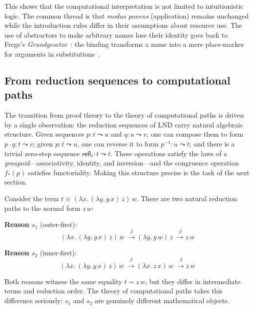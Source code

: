 \documentclass[manuscript]{BSLstyle}
\newcommand{\refl}{\mathsf{refl}}
\begin{document}
\noindent
This shows that the computational interpretation is not limited to
intuitionistic logic.  The common thread is that \emph{modus ponens}
(application) remains unchanged while the introduction rules differ in
their assumptions about resource use.  The use of abstractors to make
arbitrary names lose their identity goes back to Frege's
\emph{Grundgesetze}~\cite{Frege93:GrundI}: the binding transforms a
name into a mere place-marker for arguments in
substitutions~\cite{deQueiroz92:wittgenstein15}.

\subsection{From reduction sequences to computational paths}

The transition from proof theory to the theory of computational paths
is driven by a single observation: the reduction sequences of LND
carry natural algebraic structure.  Given sequences $p : t \leadsto u$
and $q : u \leadsto v$, one can compose them to form $p \cdot q : t
\leadsto v$; given $p : t \leadsto u$, one can reverse it to form
$p^{-1} : u \leadsto t$; and there is a trivial zero-step sequence
$\refl_t : t \leadsto t$.  These operations satisfy the laws of a
\emph{groupoid}---associativity, identity, and inversion---and the
congruence operation $f_*(p)$ satisfies functoriality.  Making this
structure precise is the task of the next section.

\begin{example}\label{ex:two-reasons}
Consider the term $t \equiv (\lambda x.\, (\lambda y.\, y\, x)\, z)\, w$.
There are two natural reduction paths to the normal form $z\, w$:

\textbf{Reason $s_1$} (outer-first):
\[
(\lambda x.\, (\lambda y.\, y\, x)\, z)\, w
\;\xrightarrow{\;\beta\;}
(\lambda y.\, y\, w)\, z
\;\xrightarrow{\;\beta\;}
z\, w
\]

\textbf{Reason $s_2$} (inner-first):
\[
(\lambda x.\, (\lambda y.\, y\, x)\, z)\, w
\;\xrightarrow{\;\beta\;}
(\lambda x.\, z\, x)\, w
\;\xrightarrow{\;\beta\;}
z\, w
\]

Both reasons witness the same equality $t = z\, w$, but they differ in
intermediate terms and reduction order.  The theory of computational paths
takes this difference seriously: $s_1$ and $s_2$ are genuinely different
mathematical objects.
\end{example}

\end{document}
